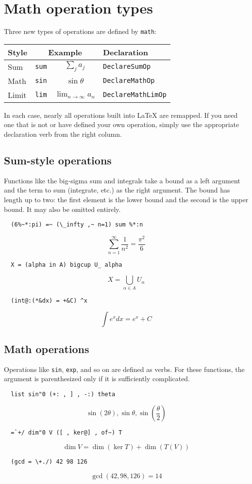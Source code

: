\documentclass{article}
\begin{document}
\section{Math operation types}
Three new types of operations are defined by \lstinline`math`:

\begin{center}\begin{tabular}{lccl}
Style & \multicolumn{2}{c}{Example}    & Declaration \\ \hline
Sum   & \lstinline`sum` & $\sum_j a_j$        & \lstinline`DeclareSumOp` \\
Math  & \lstinline`sin` & $\sin \theta$        & \lstinline`DeclareMathOp` \\
Limit & \lstinline`lim` & $\lim_{n \rightarrow \infty}a_n$ & \lstinline`DeclareMathLimOp`
\end{tabular}\end{center}

In each case, nearly all operations built into LaTeX are remapped. If you
need one that is not or have defined your own operation, simply use the
appropriate declaration verb from the right column.

\subsection{Sum-style operations}
Functions like the big-sigma sum and integrals take a bound as a left
argument and the term to sum (integrate, etc.) as the right argument.
The bound has length up to two: the first element is the lower bound and
the second is the upper bound. It may also be omitted entirely.
\begin{lstlisting}
  (6%~*:pi) =~ (\_infty ,~ n=1) sum %*:n
\end{lstlisting}
\[\sum_{n=1}^{\infty} \frac{1}{n^2}=\frac{\pi^2}{6}\]
\begin{lstlisting}
  X = (alpha in A) bigcup U_ alpha
\end{lstlisting}
\[X=\bigcup_{\alpha \in A} U_{\alpha}\]
\begin{lstlisting}
  (int@:(*&dx) = +&C) ^x
\end{lstlisting}
\[\int e^{x} dx=e^{x}+C\]

\subsection{Math operations}
Operations like \lstinline`sin`, \lstinline`exp`, and so on are defined as verbs. For
these functions, the argument is parenthesized only if it is sufficiently
complicated.
\begin{lstlisting}
  list sin"0 (+: , ] , -:) theta
\end{lstlisting}
\[\sin (2 \theta),\sin \theta,\sin \left(\frac{\theta}{2}\right)\]
\begin{lstlisting}
  =`+/ dim"0 V ([ , ker@] , of~) T
\end{lstlisting}
\[\dim V=\dim (\ker T)+\dim (T(V))\]
\begin{lstlisting}
  (gcd = \+./) 42 98 126
\end{lstlisting}
\[\gcd (42,98,126)=14\]
\end{document}
